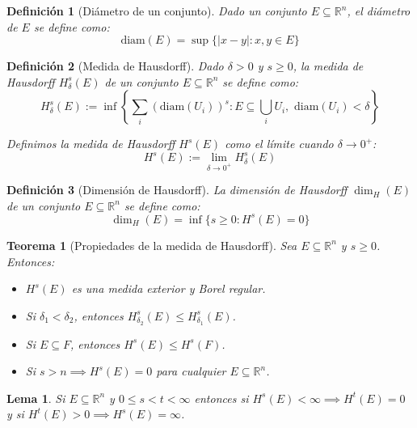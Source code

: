\documentclass[12pt,a4paper]{article}
\theoremstyle{plain}
\theoremstyle{profesional}
\newtheorem{teorema}{Teorema}[section]
\newtheorem{lemma}{Lema}[section]
\theoremstyle{definicion-style}
\newtheorem{definicion}{Definición}[section]
\newcommand{\R}{\mathbb{R}}
\begin{document}
\begin{definicion}[Diámetro de un conjunto]
	Dado un conjunto \( E \subseteq \mathbb{R}^n \), el diámetro de \( E \) se define como:\[
		\text{diam}(E) = \sup\{ |x - y| : x, y \in E \}
	\]
\end{definicion}

\begin{definicion}[Medida de Hausdorff]
	Dado \( \delta > 0 \) y \( s \geq 0 \), la medida de Hausdorff \( H^s_\delta(E) \) de un conjunto \( E \subseteq \R^n \) se define como:\[
		H_\delta^s(E) := \inf \left\{ \sum_{i} (\text{diam}(U_i))^s : E \subseteq \bigcup_{i} U_i, \text{ diam}(U_i) < \delta \right\}
	\]

	Definimos la medida de Hausdorff \( H^s(E) \) como el límite cuando \( \delta \to 0^+ \):
	\[
		H^s(E) := \lim_{\delta \to 0^+} H_\delta^s(E)
	\]
\end{definicion}

\begin{definicion}[Dimensión de Hausdorff]
	La dimensión de Hausdorff \( \dim_H(E) \) de un conjunto \( E \subseteq \R^n \) se define como:\[
		\dim_H(E) = \inf \{ s \geq 0 : H^s(E) = 0 \}
	\]
\end{definicion}

\begin{teorema}[Propiedades de la medida de Hausdorff]
	Sea \( E \subseteq \R^n \) y \( s \geq 0 \). Entonces:
	\begin{itemize}
		\item \( H^s(E) \) es una medida exterior y Borel regular.
		\item Si \( \delta_1 < \delta_2 \), entonces \( H^s_{\delta_2}(E) \leq H^s_{\delta_1}(E) \).
		\item Si \( E \subseteq F \), entonces \( H^s(E) \leq H^s(F) \).
		\item Si \( s > n \implies H^s(E) = 0 \) para cualquier \( E \subseteq \R^n \).
	\end{itemize}
\end{teorema}

\vspace{0.5cm}

\begin{lemma}\label{lemma:hausdorff-dimension}
	Si \( E \subseteq \R^n \) y \( 0 \leq s < t < \infty \) entonces si \( H^s(E) < \infty \implies H^t(E) = 0 \) y si \( H^t(E) > 0 \implies H^s(E) = \infty \).
\end{lemma}

\vspace{0.5cm}
\end{document}
